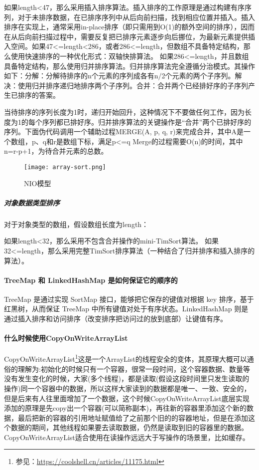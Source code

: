 \documentclass[../../../interview-questions.tex]{subfiles}
\begin{document}
如果length<47，那么采用插入排序算法。插入排序的工作原理是通过构建有序序列，对于未排序数据，在已排序序列中从后向前扫描，找到相应位置并插入。插入排序在实现上，通常采用in-place排序（即只需用到O(1)的额外空间的排序），因而在从后向前扫描过程中，需要反复把已排序元素逐步向后挪位，为最新元素提供插入空间。如果47<=length<286，或者286<=length，但数组不具备特定结构，那么使用快速排序的一种优化形式：双轴快排算法。
如果286<=length，并且数组具备特定结构，那么使用归并排序算法。归并排序算法完全遵循分治模式。其操作如下：分解：分解待排序的n个元素的序列成各有n/2个元素的两个子序列。解决：使用归并排序递归地排序两个子序列。合并：合并两个已经排好序的子序列产生已排序的答案。

当待排序的序列长度为1时，递归开始回升，这种情况下不要做任何工作，因为长度为1的每个序列都已排好序。归并排序算法的关键操作是“合并”两个已排好序的序列。下面伪代码调用一个辅助过程MERGE(A, p, q, r)来完成合并，其中A是一个数组，p、q和r是数组下标，满足p<=q Merge的过程需要O(n)的时间，其中n=r-p+1，为待合并元素的总数。

\begin{figure}[htbp]
	\centering
	\texttt{[image: array-sort.png]}
	\caption{NIO模型}
	\label{fig:arraysort}
\end{figure}

\subparagraph{对象数据类型排序}


对于对象类型的数组，假设数组长度为length：

如果length<32，那么采用不包含合并操作的mini-TimSort算法。
如果32<=length，那么采用完整TimSort排序算法（一种结合了归并排序和插入排序的算法）。

\paragraph{TreeMap 和 LinkedHashMap 是如何保证它的顺序的}

TreeMap 是通过实现 SortMap 接口，能够把它保存的键值对根据 key 排序，基于红黑树，从而保证 TreeMap 中所有键值对处于有序状态。LinkedHashMap 则是通过插入排序和访问排序（改变排序把访问过的放到底部）让键值有序。

\paragraph{什么时候使用CopyOnWriteArrayList}

CopyOnWriteArrayList\footnote{参见：\url{https://coolshell.cn/articles/11175.html}}这是一个ArrayList的线程安全的变体，其原理大概可以通俗的理解为:初始化的时候只有一个容器，很常一段时间，这个容器数据、数量等没有发生变化的时候，大家(多个线程)，都是读取(假设这段时间里只发生读取的操作)同一个容器中的数据，所以这样大家读到的数据都是唯一、一致、安全的，但是后来有人往里面增加了一个数据，这个时候CopyOnWriteArrayList底层实现添加的原理是先copy出一个容器(可以简称副本)，再往新的容器里添加这个新的数据，最后把新的容器的引用地址赋值给了之前那个旧的的容器地址，但是在添加这个数据的期间，其他线程如果要去读取数据，仍然是读取到旧的容器里的数据。CopyOnWriteArrayList适合使用在读操作远远大于写操作的场景里，比如缓存。
\end{document}
